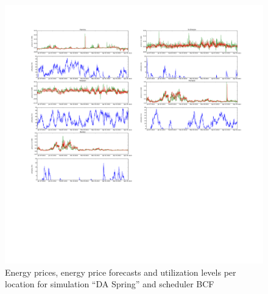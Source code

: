 \begin{figure}[htbp]
	\centering
	\vspace*{-0.6in}
	\hspace*{-1.9in}
		\includegraphics[width=1.60\textwidth]{figures/appendix_simulation_results/DA_Spring_scenario_2.pdf}
	\vspace*{-2.8in}
	\caption{Energy prices, energy price forecasts and utilization levels per location for simulation ``DA Spring'' and scheduler BCF}
	\label{fig:app_DA_Spring_scenario_2}
\end{figure}

